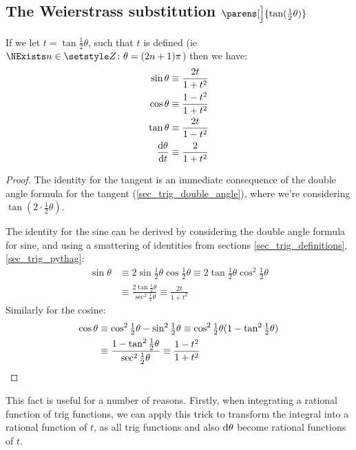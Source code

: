 \subsection[The Weierstrass substitution
            \texorpdfstring{(\(\tan(\theta / 2)\))}{(tangent half-angle)}]
   {The Weierstrass substitution \boldmath\(\parens[\Big]{\tan(\tfrac 12 \theta)}\)}

\begin{theorem}
 If we let \(t = \tan \tfrac 12 \theta\), such that \(t\) is defined (ie
 \(\NExists n \in \Integers \colon \theta = (2n + 1)\pi\)) then we have:
 \begin{align*}
  \sin \theta &\equiv \frac{2t}{1 + t^2} \\
  \cos \theta &\equiv \frac{1 - t^2}{1 + t^2} \\
  \tan \theta &\equiv \frac{2t}{1 - t^2} \\
  \dv<\theta>{t} &\equiv \frac 2{1 + t^2}
 \end{align*}
\end{theorem}
\begin{proof}
 The identity for the tangent is an immediate consequence of the double
 angle formula for the tangent (\ref{sec_trig_double_angle}), where we're
 considering \(\tan{(2 \cdot \frac 12 \theta)}\).

 The identity for the sine can be derived by considering the double angle
 formula for sine, and using a smattering of identities from sections
 \ref{sec_trig_definitions}, \ref{sec_trig_pythag}:
 \begin{align*}
  \sin \theta &\equiv 2\sin \tfrac 12 \theta \cos\tfrac 12 \theta
      \equiv 2\tan \tfrac 12 \theta \cos^2 \tfrac 12 \theta \\
      &\equiv \frac{2\tan \tfrac 12 \theta}{\sec^2 \tfrac 12 \theta}
      \equiv \frac{2t}{1 + t^2}
 \end{align*}
 Similarly for the cosine:
 \begin{align*}
  \cos \theta
      &\equiv \cos^2 \tfrac 12 \theta - \sin^2 \tfrac 12 \theta
      \equiv \cos^2 \tfrac 12 \theta
          (1 - \tan^2 \tfrac 12 \theta) \\
      &\equiv \frac{1 - \tan^2 \tfrac 12 \theta}
                   {\sec^2 \tfrac 12 \theta}
      \equiv \frac{1 - t^2}{1 + t^2} \qedhere
 \end{align*}
\end{proof}

This fact is useful for a number of reasons. Firstly, when integrating a
rational function of trig functions, we can apply this trick to transform
the integral into a rational function of \(t\), as all trig functions and
also \(\mathrm d \theta\) become rational functions of \(t\).

